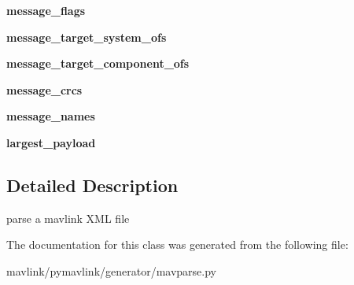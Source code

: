 \begin{DoxyCompactItemize}
{\bfseries message\+\_\+flags}
\item 
\mbox{\label{classpymavlink_1_1generator_1_1mavparse_1_1MAVXML_a43bc740840f2d411588dcc2e8ab8fb17}} 
{\bfseries message\+\_\+target\+\_\+system\+\_\+ofs}
\item 
\mbox{\label{classpymavlink_1_1generator_1_1mavparse_1_1MAVXML_ac17319f441eea0e57691c811c96c0c2c}} 
{\bfseries message\+\_\+target\+\_\+component\+\_\+ofs}
\item 
\mbox{\label{classpymavlink_1_1generator_1_1mavparse_1_1MAVXML_ada7404f0e6690ed6678409db9d2f7129}} 
{\bfseries message\+\_\+crcs}
\item 
\mbox{\label{classpymavlink_1_1generator_1_1mavparse_1_1MAVXML_a0ee8ced77953ec04ddbdc206d1c0c317}} 
{\bfseries message\+\_\+names}
\item 
\mbox{\label{classpymavlink_1_1generator_1_1mavparse_1_1MAVXML_a3d5f26513d16758de8117560b60e1ff4}} 
{\bfseries largest\+\_\+payload}
\end{DoxyCompactItemize}


\subsection{Detailed Description}
\begin{DoxyVerb}parse a mavlink XML file\end{DoxyVerb}
 

The documentation for this class was generated from the following file\+:\begin{DoxyCompactItemize}
\item 
mavlink/pymavlink/generator/mavparse.\+py\end{DoxyCompactItemize}
